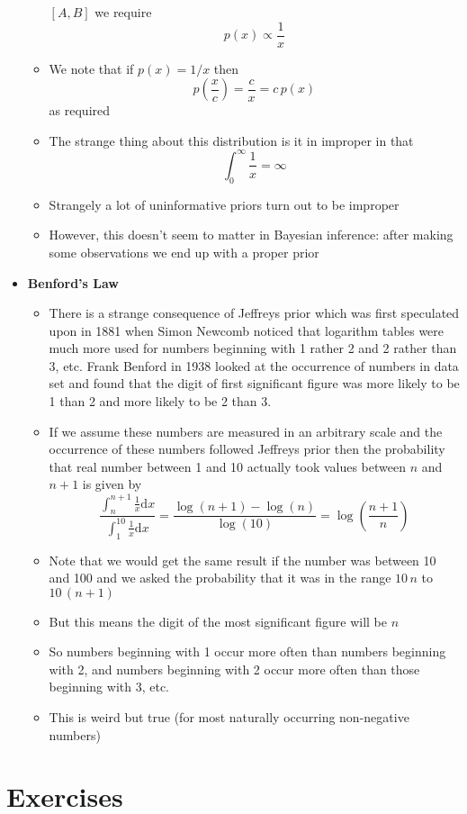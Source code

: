 \documentclass[11pt]{article}
\newcommand{\logg}[1]{\log\!\left( #1 \right)}
\newcommand{\dd}{\mathrm{d}}
\begin{document}
\begin{itemize}
\begin{itemize}
\([A,B]\) we require
$$ p(x) \propto \frac{1}{x} $$
\item We note that if \(p(x)=1/x\) then
$$ p\!\left(\frac{x}{c}\right)  = \frac{c}{x} = c \, p(x) $$
as required
\item The strange thing about this distribution is it in improper in
that 
$$ \int_0^\infty \frac{1}{x} = \infty $$
\item Strangely a lot of uninformative priors turn out to be improper
\item However, this doesn't seem to matter in Bayesian inference:
after making some observations we end up with a proper prior
\end{itemize}
\item \textbf{Benford's Law}
\begin{itemize}
\item There is a strange consequence of Jeffreys prior which was
first speculated upon in 1881 when Simon Newcomb noticed that
logarithm tables were much more used for numbers beginning with
1 rather 2 and 2 rather than 3, etc.  Frank Benford in 1938
looked at the occurrence of numbers in data set and found that
the digit of first significant figure was more likely to be 1
than 2 and more likely to be 2 than 3.
\item If we assume these numbers are measured in an arbitrary scale
and the occurrence of these numbers followed Jeffreys prior
then the probability that real number between 1 and 10 actually
took values between \(n\) and \(n+1\) is given by
$$ \frac{\int_n^{n+1} \frac{1}{x} \dd x}{\int_1^{10} \frac{1}{x}
       \dd x} = \frac{\log(n+1) - \log(n)}{\log(10)} =
       \logg{\frac{n+1}{n}} $$
\item Note that we would get the same result if the number was
between 10 and 100 and we asked the probability that it was in
the range \(10\,n\) to \(10\,(n+1)\)
\item But this means the digit of the most significant figure will be \(n\)
\item So numbers beginning with 1 occur more often than numbers
beginning with 2, and numbers beginning with 2 occur more often
than those beginning with 3, etc.
\item This is weird but true (for most naturally occurring
non-negative numbers)
\end{itemize}
\end{itemize}


\section{Exercises}
\label{sec:org209e3ec}
\end{document}
